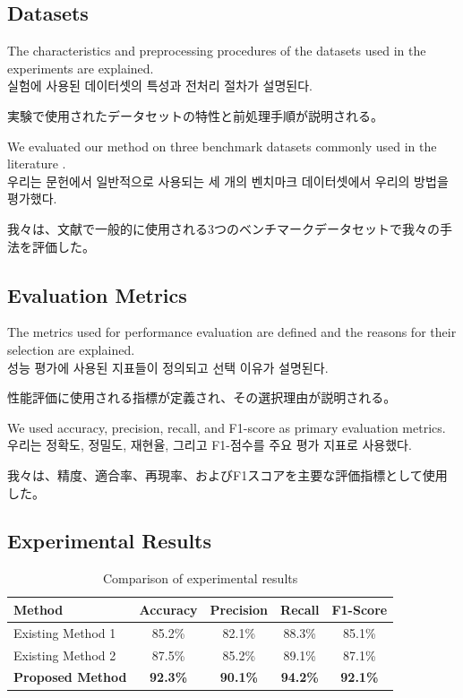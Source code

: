 \documentclass[preprint,12pt]{elsarticle}
\begin{document}
\subsection{Datasets}
The characteristics and preprocessing procedures of the datasets used in the experiments are explained. \\
실험에 사용된 데이터셋의 특성과 전처리 절차가 설명된다. \\
\begin{CJK}{UTF8}{min}
実験で使用されたデータセットの特性と前処理手順が説明される。
\end{CJK}

We evaluated our method on three benchmark datasets commonly used in the literature \cite{deng2009imagenet}. \\
우리는 문헌에서 일반적으로 사용되는 세 개의 벤치마크 데이터셋에서 우리의 방법을 평가했다. \\
\begin{CJK}{UTF8}{min}
我々は、文献で一般的に使用される3つのベンチマークデータセットで我々の手法を評価した。
\end{CJK}

\subsection{Evaluation Metrics}
The metrics used for performance evaluation are defined and the reasons for their selection are explained. \\
성능 평가에 사용된 지표들이 정의되고 선택 이유가 설명된다. \\
\begin{CJK}{UTF8}{min}
性能評価に使用される指標が定義され、その選択理由が説明される。
\end{CJK}

We used accuracy, precision, recall, and F1-score as primary evaluation metrics. \\
우리는 정확도, 정밀도, 재현율, 그리고 F1-점수를 주요 평가 지표로 사용했다. \\
\begin{CJK}{UTF8}{min}
我々は、精度、適合率、再現率、およびF1スコアを主要な評価指標として使用した。
\end{CJK}

\subsection{Experimental Results}
\begin{table}[htbp]
\centering
\caption{Comparison of experimental results}
\label{tab:results}
\begin{tabular}{@{}lcccc@{}}
\toprule
Method & Accuracy & Precision & Recall & F1-Score \\
\midrule
Existing Method 1 & 85.2\% & 82.1\% & 88.3\% & 85.1\% \\
Existing Method 2 & 87.5\% & 85.2\% & 89.1\% & 87.1\% \\
\textbf{Proposed Method} & \textbf{92.3\%} & \textbf{90.1\%} & \textbf{94.2\%} & \textbf{92.1\%} \\
\bottomrule
\end{tabular}
\end{table}
\end{document}

